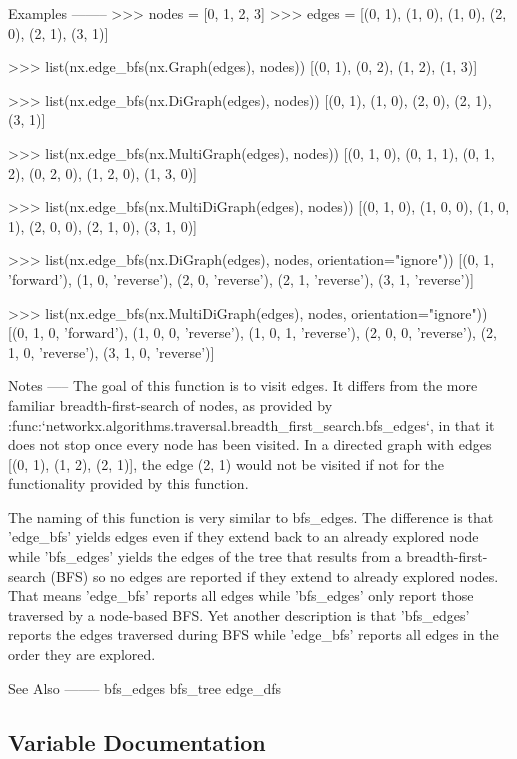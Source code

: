 \begin{DoxyVerb}
Examples
--------
>>> nodes = [0, 1, 2, 3]
>>> edges = [(0, 1), (1, 0), (1, 0), (2, 0), (2, 1), (3, 1)]

>>> list(nx.edge_bfs(nx.Graph(edges), nodes))
[(0, 1), (0, 2), (1, 2), (1, 3)]

>>> list(nx.edge_bfs(nx.DiGraph(edges), nodes))
[(0, 1), (1, 0), (2, 0), (2, 1), (3, 1)]

>>> list(nx.edge_bfs(nx.MultiGraph(edges), nodes))
[(0, 1, 0), (0, 1, 1), (0, 1, 2), (0, 2, 0), (1, 2, 0), (1, 3, 0)]

>>> list(nx.edge_bfs(nx.MultiDiGraph(edges), nodes))
[(0, 1, 0), (1, 0, 0), (1, 0, 1), (2, 0, 0), (2, 1, 0), (3, 1, 0)]

>>> list(nx.edge_bfs(nx.DiGraph(edges), nodes, orientation="ignore"))
[(0, 1, 'forward'), (1, 0, 'reverse'), (2, 0, 'reverse'), (2, 1, 'reverse'), (3, 1, 'reverse')]

>>> list(nx.edge_bfs(nx.MultiDiGraph(edges), nodes, orientation="ignore"))
[(0, 1, 0, 'forward'), (1, 0, 0, 'reverse'), (1, 0, 1, 'reverse'), (2, 0, 0, 'reverse'), (2, 1, 0, 'reverse'), (3, 1, 0, 'reverse')]

Notes
-----
The goal of this function is to visit edges. It differs from the more
familiar breadth-first-search of nodes, as provided by
:func:`networkx.algorithms.traversal.breadth_first_search.bfs_edges`, in
that it does not stop once every node has been visited. In a directed graph
with edges [(0, 1), (1, 2), (2, 1)], the edge (2, 1) would not be visited
if not for the functionality provided by this function.

The naming of this function is very similar to bfs_edges. The difference
is that 'edge_bfs' yields edges even if they extend back to an already
explored node while 'bfs_edges' yields the edges of the tree that results
from a breadth-first-search (BFS) so no edges are reported if they extend
to already explored nodes. That means 'edge_bfs' reports all edges while
'bfs_edges' only report those traversed by a node-based BFS. Yet another
description is that 'bfs_edges' reports the edges traversed during BFS
while 'edge_bfs' reports all edges in the order they are explored.

See Also
--------
bfs_edges
bfs_tree
edge_dfs\end{DoxyVerb}
 

\subsection{Variable Documentation}
\mbox{\label{namespacenetworkx_1_1algorithms_1_1traversal_1_1edgebfs_a79cc754e55af9eaa2697c22a6e5812ca}} 
